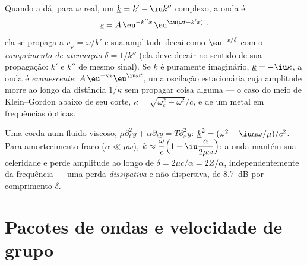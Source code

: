\begin{definition}\label{def:b2:dispersion-wave-packets:complex}
Quando a  dá, para $\omega$ real, um
$\underline k = k' - \iu k''$ complexo, a onda é
\[
\underline s = A\,\eu^{-k''x}\,\eu^{\iu(\omega t - k'x)} :
\]
ela se propaga a $v_\varphi = \omega/k'$ e sua amplitude decai como
$\eu^{-x/\delta}$ com o \emph{comprimento de atenuação} $\delta = 1/k''$ (ela deve
decair no sentido de sua propagação: $k'$ e $k''$ de mesmo sinal).
Se $\underline k$ é puramente imaginário, $\underline k = -\iu\kappa$, a onda é
\emph{evanescente}: $A\,\eu^{-\kappa x}\eu^{\iu\omega t}$, uma oscilação estacionária
cuja amplitude morre ao longo da distância $1/\kappa$ sem propagar
coisa alguma --- o caso do meio de Klein--Gordon abaixo de seu corte,
$\kappa = \sqrt{\omega_c^2 - \omega^2}/c$, e de um metal em frequências ópticas.
\end{definition}

\begin{example}\label{ex:b2:dispersion-wave-packets:damped}
Uma corda num fluido viscoso, $\mu\partial_t^2y + \alpha\partial_ty = T\partial_x^2y$:
$\underline k^2 = (\omega^2 - \iu\alpha\omega/\mu)/c^2$. Para amortecimento fraco ($\alpha \ll \mu
\omega$), $\underline k \approx \dfrac\omega c\Bigl(1 - \iu\dfrac{\alpha}{2\mu\omega}\Bigr)$: a onda
mantém sua celeridade e perde amplitude ao longo de $\delta = 2\mu c/\alpha = 2Z/\alpha$,
independentemente da frequência --- uma perda \emph{dissipativa} e não dispersiva,
de \qty{8.7}{dB} por comprimento $\delta$.
\end{example}

\section{Pacotes de ondas e velocidade de grupo}

